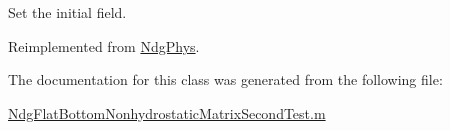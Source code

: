 Set the initial field. 



Reimplemented from \hyperlink{class_ndg_phys_a300c8d73472e9397d961b5d1aa5470e1}{Ndg\+Phys}.



The documentation for this class was generated from the following file\+:\begin{DoxyCompactItemize}
\item 
\hyperlink{_ndg_flat_bottom_nonhydrostatic_matrix_second_test_8m}{Ndg\+Flat\+Bottom\+Nonhydrostatic\+Matrix\+Second\+Test.\+m}\end{DoxyCompactItemize}
